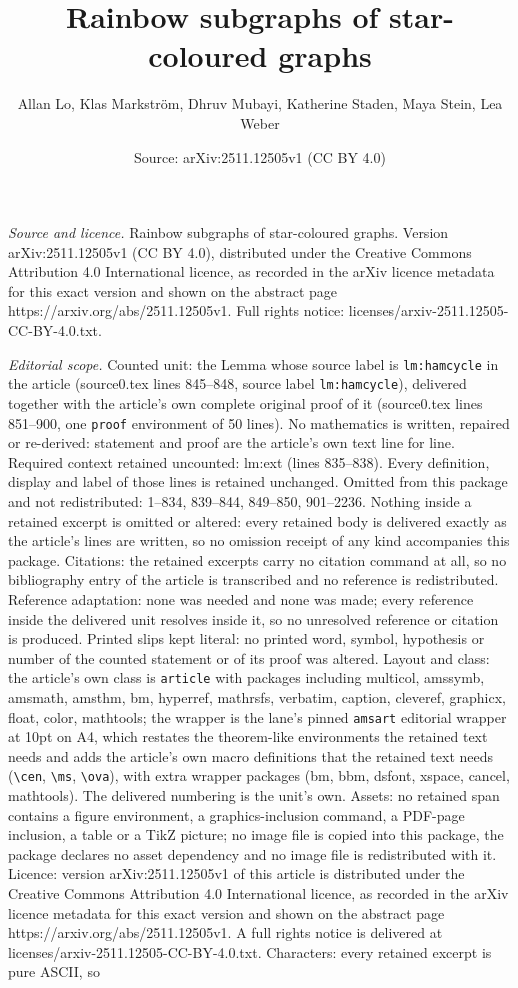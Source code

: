 \documentclass[10pt,a4paper]{amsart}
\title[Rainbow subgraphs of star-coloured graphs]{Rainbow subgraphs of star-coloured graphs}
\author{Allan Lo, Klas Markstr\"om, Dhruv Mubayi, Katherine Staden, Maya Stein, Lea Weber}
\date{Source: arXiv:2511.12505v1 (CC BY 4.0)}
\begin{document}
\maketitle

\noindent\emph{Source and licence.} Rainbow subgraphs of star-coloured graphs. Version arXiv:2511.12505v1 (CC BY 4.0), distributed under the Creative Commons Attribution 4.0 International licence, as recorded in the arXiv licence metadata for this exact version and shown on the abstract page https://arxiv.org/abs/2511.12505v1. Full rights notice: licenses/arxiv-2511.12505-CC-BY-4.0.txt.\par\smallskip

\noindent\textit{Editorial scope.} Counted unit: the Lemma whose source label is \texttt{lm:hamcycle} in the article (source0.tex lines 845--848, source label \texttt{lm:hamcycle}), delivered together with the article's own complete original proof of it (source0.tex lines 851--900, one \texttt{proof} environment of 50 lines). No mathematics is written, repaired or re-derived: statement and proof are the article's own text line for line. Required context retained uncounted: lm:ext (lines 835--838). Every definition, display and label of those lines is retained unchanged. Omitted from this package and not redistributed: 1--834, 839--844, 849--850, 901--2236. Nothing inside a retained excerpt is omitted or altered: every retained body is delivered exactly as the article's lines are written, so no omission receipt of any kind accompanies this package. Citations: the retained excerpts carry no citation command at all, so no bibliography entry of the article is transcribed and no reference is redistributed. Reference adaptation: none was needed and none was made; every reference inside the delivered unit resolves inside it, so no unresolved reference or citation is produced. Printed slips kept literal: no printed word, symbol, hypothesis or number of the counted statement or of its proof was altered. Layout and class: the article's own class is \texttt{article} with packages including multicol, amssymb, amsmath, amsthm, bm, hyperref, mathrsfs, verbatim, caption, cleveref, graphicx, float, color, mathtools; the wrapper is the lane's pinned \texttt{amsart} editorial wrapper at 10pt on A4, which restates the theorem-like environments the retained text needs and adds the article's own macro definitions that the retained text needs (\texttt{\textbackslash cen}, \texttt{\textbackslash ms}, \texttt{\textbackslash ova}), with extra wrapper packages (bm, bbm, dsfont, xspace, cancel, mathtools). The delivered numbering is the unit's own. Assets: no retained span contains a figure environment, a graphics-inclusion command, a PDF-page inclusion, a table or a TikZ picture; no image file is copied into this package, the package declares no asset dependency and no image file is redistributed with it. Licence: version arXiv:2511.12505v1 of this article is distributed under the Creative Commons Attribution 4.0 International licence, as recorded in the arXiv licence metadata for this exact version and shown on the abstract page https://arxiv.org/abs/2511.12505v1. A full rights notice is delivered at licenses/arxiv-2511.12505-CC-BY-4.0.txt. Characters: every retained excerpt is pure ASCII, so 
\end{document}
